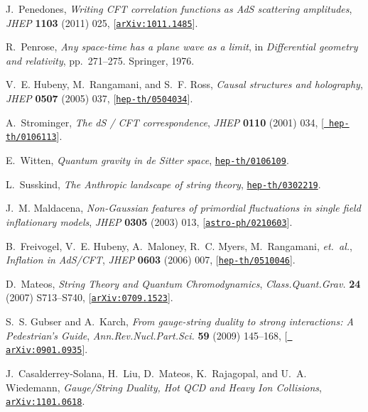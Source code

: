 \documentclass[12pt]{article}
\begin{document}
\begin{thebibliography}{100}
J.~Penedones, {\it {Writing CFT correlation functions as AdS scattering
  amplitudes}},  {\em JHEP} {\bf 1103} (2011) 025,
  [\href{http://xxx.lanl.gov/abs/1011.1485}{{\tt arXiv:1011.1485}}].

R.~Penrose, {\it Any space-time has a plane wave as a limit},  in {\em
  Differential geometry and relativity}, pp.~271--275.
\newblock Springer, 1976.

V.~E. Hubeny, M.~Rangamani, and S.~F. Ross, {\it {Causal structures and
  holography}},  {\em JHEP} {\bf 0507} (2005) 037,
  [\href{http://xxx.lanl.gov/abs/hep-th/0504034}{{\tt hep-th/0504034}}].

A.~Strominger, {\it {The dS / CFT correspondence}},  {\em JHEP} {\bf 0110}
  (2001) 034, [\href{http://xxx.lanl.gov/abs/hep-th/0106113}{{\tt
  hep-th/0106113}}].

E.~Witten, {\it {Quantum gravity in de Sitter space}},
  \href{http://xxx.lanl.gov/abs/hep-th/0106109}{{\tt hep-th/0106109}}.

L.~Susskind, {\it {The Anthropic landscape of string theory}},
  \href{http://xxx.lanl.gov/abs/hep-th/0302219}{{\tt hep-th/0302219}}.

J.~M. Maldacena, {\it {Non-Gaussian features of primordial fluctuations in
  single field inflationary models}},  {\em JHEP} {\bf 0305} (2003) 013,
  [\href{http://xxx.lanl.gov/abs/astro-ph/0210603}{{\tt astro-ph/0210603}}].

B.~Freivogel, V.~E. Hubeny, A.~Maloney, R.~C. Myers, M.~Rangamani, {\em
  et.~al.}, {\it {Inflation in AdS/CFT}},  {\em JHEP} {\bf 0603} (2006) 007,
  [\href{http://xxx.lanl.gov/abs/hep-th/0510046}{{\tt hep-th/0510046}}].

D.~Mateos, {\it {String Theory and Quantum Chromodynamics}},  {\em
  Class.Quant.Grav.} {\bf 24} (2007) S713--S740,
  [\href{http://xxx.lanl.gov/abs/0709.1523}{{\tt arXiv:0709.1523}}].

S.~S. Gubser and A.~Karch, {\it {From gauge-string duality to strong
  interactions: A Pedestrian's Guide}},  {\em Ann.Rev.Nucl.Part.Sci.} {\bf 59}
  (2009) 145--168, [\href{http://xxx.lanl.gov/abs/0901.0935}{{\tt
  arXiv:0901.0935}}].

J.~Casalderrey-Solana, H.~Liu, D.~Mateos, K.~Rajagopal, and U.~A. Wiedemann,
  {\it {Gauge/String Duality, Hot QCD and Heavy Ion Collisions}},
  \href{http://xxx.lanl.gov/abs/1101.0618}{{\tt arXiv:1101.0618}}.


\end{thebibliography}
\end{document}
